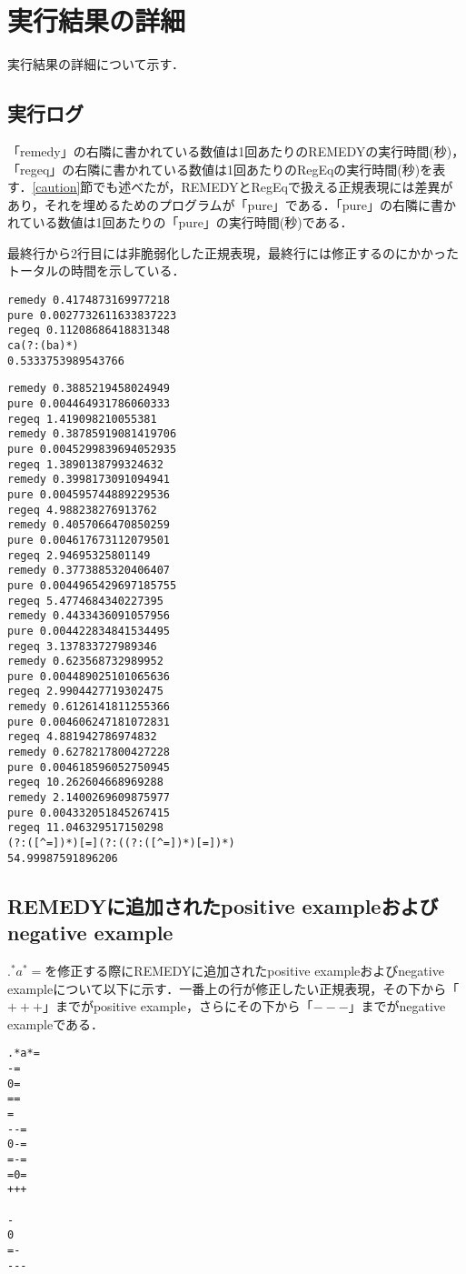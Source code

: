 \documentclass[a4paper, 12pt, dvipdfmx, uplatex]{jsreport}
\begin{document}
\chapter{実行結果の詳細}
実行結果の詳細について示す．

\section{実行ログ}
「remedy」の右隣に書かれている数値は1回あたりのREMEDYの実行時間(秒)，「regeq」の右隣に書かれている数値は1回あたりのRegEqの実行時間(秒)を表す．\ref{caution}節でも述べたが，REMEDYとRegEqで扱える正規表現には差異があり，それを埋めるためのプログラムが「pure」である．「pure」の右隣に書かれている数値は1回あたりの「pure」の実行時間(秒)である．

最終行から2行目には非脆弱化した正規表現，最終行には修正するのにかかったトータルの時間を示している．

\begin{lstlisting}[caption=$c(ab)^*a(ba)^*$を入力したときの実行ログ,label=number]
remedy 0.4174873169977218
pure 0.0027732611633837223
regeq 0.11208686418831348
ca(?:(ba)*)
0.5333753989543766
\end{lstlisting}


\begin{lstlisting}[caption=$.^*a^*\mathrm{=}$を入力したときの実行ログ,label=number]
remedy 0.3885219458024949
pure 0.004464931786060333
regeq 1.419098210055381
remedy 0.38785919081419706
pure 0.0045299839694052935
regeq 1.3890138799324632
remedy 0.3998173091094941
pure 0.004595744889229536
regeq 4.988238276913762
remedy 0.4057066470850259
pure 0.004617673112079501
regeq 2.94695325801149
remedy 0.3773885320406407
pure 0.0044965429697185755
regeq 5.4774684340227395
remedy 0.4433436091057956
pure 0.004422834841534495
regeq 3.137833727989346
remedy 0.623568732989952
pure 0.004489025101065636
regeq 2.9904427719302475
remedy 0.6126141811255366
pure 0.004606247181072831
regeq 4.881942786974832
remedy 0.6278217800427228
pure 0.004618596052750945
regeq 10.262604668969288
remedy 2.1400269609875977
pure 0.004332051845267415
regeq 11.046329517150298
(?:([^=])*)[=](?:((?:([^=])*)[=])*)
54.99987591896206
\end{lstlisting}

\section{REMEDYに追加されたpositive exampleおよびnegative example}
$.^*a^*\mathrm{=}$を修正する際にREMEDYに追加されたpositive exampleおよびnegative exampleについて以下に示す．一番上の行が修正したい正規表現，その下から「$\mathtt{+++}$」までがpositive example，さらにその下から「$\mathtt{---}$」までがnegative exampleである．

\begin{lstlisting}[caption=$.^*a^*\mathrm{=}$を修正する際にREMEDYに追加されたpositive exampleおよびnegative example,label=number]
.*a*=
-=
0=
==
=
--=
0-=
=-=
=0=
+++

-
0
=-
---

\end{lstlisting}
\end{document}

